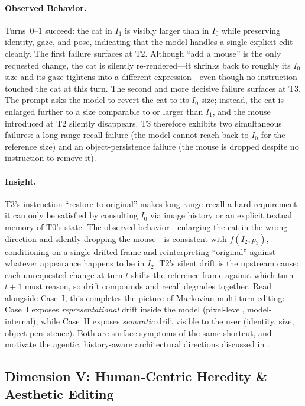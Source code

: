 \documentclass{llmxive}
\begin{document}
\paragraph{Observed Behavior.}
Turns~0--1 succeed: the cat in $I_1$ is visibly larger than in $I_0$ while preserving identity, gaze, and pose, indicating that the model handles a single explicit edit cleanly. The first failure surfaces at T2. Although ``add a mouse'' is the only requested change, the cat is silently re-rendered---it shrinks back to roughly its $I_0$ size and its gaze tightens into a different expression---even though no instruction touched the cat at this turn. The second and more decisive failure surfaces at T3. The prompt asks the model to revert the cat to its $I_0$ size; instead, the cat is enlarged further to a size comparable to or larger than $I_1$, and the mouse introduced at T2 silently disappears. T3 therefore exhibits two simultaneous failures: a long-range recall failure (the model cannot reach back to $I_0$ for the reference size) and an object-persistence failure (the mouse is dropped despite no instruction to remove it).

\paragraph{Insight.}
T3's instruction ``restore to original'' makes long-range recall a hard requirement: it can only be satisfied by consulting $I_0$ via image history or an explicit textual memory of T0's state. The observed behavior---enlarging the cat in the wrong direction and silently dropping the mouse---is consistent with $f(I_2, p_3)$, conditioning on a single drifted frame and reinterpreting ``original'' against whatever appearance happens to be in $I_2$. T2's silent drift is the upstream cause: each unrequested change at turn $t$ shifts the reference frame against which turn $t{+}1$ must reason, so drift compounds and recall degrades together. Read alongside Case~I, this completes the picture of Markovian multi-turn editing: Case~I exposes \emph{representational} drift inside the model (pixel-level, model-internal), while Case~II exposes \emph{semantic} drift visible to the user (identity, size, object persistence). Both are surface symptoms of the same shortcut, and motivate the agentic, history-aware architectural directions discussed in .

\endgroup


\subsection{Dimension V: Human-Centric Heredity \& Aesthetic Editing}
\end{document}
